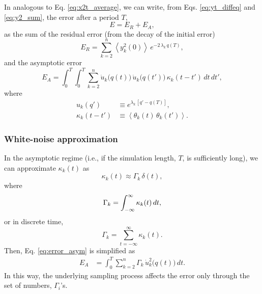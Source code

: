 \documentclass[reprint, floatfix]{revtex4-1}
\newcommand{\Err}{E}
\begin{document}
In analogous to Eq. \eqref{eq:x2t_average},
we can write,
from Eqs. \eqref{eq:yt_diffeq} and \eqref{eq:y2_sum},
the error after a period $T$,
%
\begin{equation}
  \Err
  =
  \Err_R + \Err_A,
  \label{eq:error_split}
\end{equation}
%
as the sum of the residual error
(from the decay of the initial error)
%
\begin{equation}
  \Err_R
  =
  \sum_{k = 2}^n
    \left\langle y_k^2(0) \right\rangle \,
    e^{ - 2 \, \lambda_k  \, q(T) },
  \label{eq:error_res}
\end{equation}
%
and the asymptotic error
\begin{equation}
  \Err_A
  =
  \int_0^T \int_0^T
  \sum_{k = 2}^n
    \dot u_k\bigl( q(t) \bigr) \,
    \dot u_k\bigl( q(t') \bigr) \,
    \kappa_k(t - t') \, dt \, dt',
  \label{eq:error_asym}
\end{equation}
%
where
\begin{align*}
  u_k(q')
  &\equiv
  e^{\lambda_k \, [q' - q(T)]},
  \\
  \kappa_k(t - t')
  &\equiv
  \left\langle
    \theta_k(t) \, \theta_k(t')
  \right\rangle.
\end{align*}



\subsubsection{White-noise approximation}



In the asymptotic regime
(i.e., if the simulation length, $T$, is sufficiently long),
we can approximate $\kappa_k(t)$ as
%
\begin{equation}
  \kappa_k(t) \approx \Gamma_k \, \delta(t)
  ,
\label{eq:kappa_delta}
\end{equation}
%
where
\begin{equation}
  \Gamma_k = \int_{-\infty}^\infty \kappa_k(t) \, dt,
  \notag
\end{equation}
or in discrete time,
\begin{equation}
  \Gamma_k = \sum_{t = -\infty}^\infty \kappa_k(t).
  \label{eq:Gamma_sum}
\end{equation}
%
Then, Eq. \eqref{eq:error_asym} is simplified as
%
\begin{align}
  \Err_A
  &=
  \int_0^T
  \sum_{k = 2}^n
  \Gamma_k \, \dot u_k^2\bigl( q(t) \bigr) \, dt.
  \label{eq:error_asym1}
\end{align}
%
In this way,
the underlying sampling process
affects the error only through the set of numbers, $\Gamma_i$'s.
\end{document}
